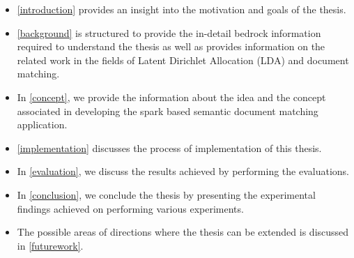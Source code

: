 \begin{itemize}
\item \ref{introduction} provides an insight into the motivation and goals of the thesis.

\item \ref{background} is structured to provide the in-detail bedrock information required to understand the thesis as well as provides information on the related work in the fields of Latent Dirichlet Allocation (LDA) and document matching.


\item In \ref{concept}, we provide the information about the idea and the concept associated in developing the spark based semantic document matching application. 

\item \ref{implementation} discusses the process of implementation of this thesis.

\item In \ref{evaluation}, we discuss the results achieved by performing the evaluations.

\item In \ref{conclusion}, we conclude the thesis by presenting the experimental findings achieved on performing various experiments.

\item The possible areas of directions where the thesis can be extended is discussed in \ref{futurework}.
\end{itemize}

